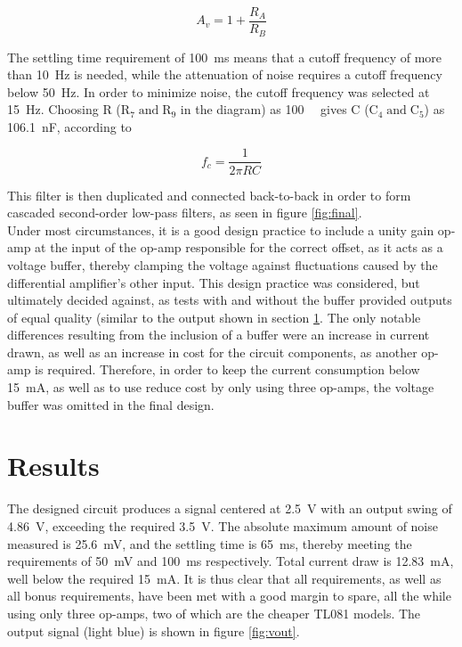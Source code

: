 $${A_v}=1+\frac{{R}_A}{R_B}$$

The settling time requirement of \SI{100}{ms} means that a cutoff frequency of more than \SI{10}{Hz} is needed, while the attenuation of noise requires a cutoff frequency below \SI{50}{Hz}. In order to minimize noise, the cutoff frequency was selected at \SI{15}{Hz}. Choosing R ($\mathrm{R_7 \; and \; R_9}$ in the diagram) as \SI{100}{\kilo\Omega} gives C ($\mathrm{C_4 \; and \; C_5}$) as \SI{106.1}{nF}, according to

$$f_c=\frac{1}{2 \pi RC}$$

This filter is then duplicated and connected back-to-back in order to form cascaded second-order low-pass filters, as seen in figure \ref{fig:final}.\\

Under most circumstances, it is a good design practice to include a unity gain op-amp at the input of the op-amp responsible for the correct offset, as it acts as a voltage buffer, thereby clamping the voltage against fluctuations caused by the differential amplifier's other input. This design practice was considered, but ultimately decided against, as tests with and without the buffer provided outputs of equal quality (similar to the output shown in section \ref{sec:temp_results}. The only notable differences resulting from the inclusion of a buffer were an increase in current drawn, as well as an increase in cost for the circuit components, as another op-amp is required. Therefore, in order to keep the current consumption below \SI{15}{mA}, as well as to use reduce cost by only using three op-amps, the voltage buffer was omitted in the final design. 


\section{Results} \label{sec:temp_results}
The designed circuit produces a signal centered at \SI{2.5}{\volt} with an output swing of \SI{4.86}{\volt}, exceeding the required \SI{3.5}{\volt}. The absolute maximum amount of noise measured is \SI{25.6}{\milli\volt}, and the settling time is \SI{65}{ms}, thereby meeting the requirements of \SI{50}{\milli\volt} and \SI{100}{ms} respectively. Total current draw is \SI{12.83}{mA}, well below the required \SI{15}{mA}. It is thus clear that all requirements, as well as all bonus requirements, have been met with a good margin to spare, all the while using only three op-amps, two of which are the cheaper TL081 models. The output signal (light blue) is shown in figure \ref{fig:vout}.

